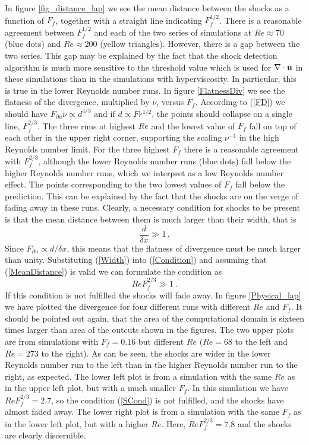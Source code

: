 In figure \ref{fig_distance_lap} we see the mean distance between the shocks as a function of $ F_f $, together with a straight line indicating $ F_f^{1/2} $. There is a reasonable agreement between $ F_f ^{1/2} $ and each of the two series of simulations at $ Re \approx 70 $ (blue dots) and $ Re \approx 200$ (yellow triangles). However, there is a gap between the two series. This gap may be explained by the fact that the shock detection algorithm is much more sensitive to the threshold value which is used for $ \nabla \cdot {\bf u} $ in these simulations than in the simulations with hyperviscosity.  In particular, this is true in the lower Reynolds number runs. In figure \ref{FlatnessDiv} we see the flatness of the divergence, multiplied by $ \nu $, versus $ F_f $. According to (\ref{FD}) we should have $ F_{\partial u} \nu \propto  d^{4/3} $ and if $ d \propto Fr^{1/2} $, the points should collapse on a single line, $ F_f^{2/3} $.  The three runs at highest $ Re $ and the lowest value of $ F_f $ fall on top of each other in the upper right corner, supporting the scaling $ \nu^{-1} $ in the high Reynolds number limit. For the three highest $ F_f $ there is a reasonable agreement with $ F_f^{2/3} $, although the lower Reynolds number runs (blue dots) fall below the higher Reynolds number runs, which we interpret as a low Reynolds number effect. The points corresponding to the two lowest values of $ F_f $ fall below the prediction. This can be explained by the fact that the shocks are on the verge of fading away in these runs. Clearly, a necessary condition for shocks to be present is that the mean distance between them is much larger than their  width, that is
\begin{equation} \label{Condition} 
\frac{d}{\delta x} \gg  1\, .
\end{equation} 
Since $ F_{\partial u} \propto d/\delta x $, this means that the flatness of divergence must be much larger than unity. Substituting (\ref{Width}) into (\ref{Condition})  and assuming that (\ref{MeanDistance}) is valid we can formulate the condition as
\begin{equation}  \label{SCond}
Re F_f^{2/3} \gg 1 \, .
\end{equation} 
If this condition is not fulfilled the shocks will fade away.  In figure \ref{Physical_lap} we have plotted the divergence for four different runs with different $ Re $ and $ F_f $. It should be pointed out again, that the area of the computational domain is sixteen times larger than area of the outcuts shown in the figures.  The two upper plots are from simulations with  $ F_f = 0.16 $ but different $ Re $ ($ Re = 68 $ to the left and $ Re = 273 $ to the right). As can be seen, the shocks are wider in the lower Reynolds number run to the left than in the higher Reynolds number run to the right, as expected. The lower left plot is from a simulation with the same $ Re $ as in the upper left plot, but with a much smaller $ F_f $. In this simulation we have $ Re F_f^{2/3} = 2.7 $, so the condition (\ref{SCond}) is not fulfilled, and the shocks have almost faded away. The lower right plot is from a simulation with the same $ F_f $ as in the lower left plot, but with a higher $ Re $. Here, $ Re F_f^{2/3} = 7.8 $ and  the shocks are clearly discernible.



% 
% 
%
% 
